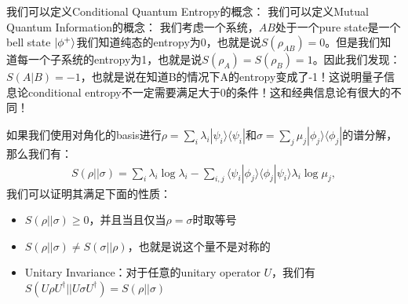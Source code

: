   \bigskip

  我们可以定义Conditional Quantum Entropy的概念：
  我们可以定义Mutual Quantum Information的概念：
  我们考虑一个系统，$ AB $处于一个pure state是一个bell state $ \left| \phi^+ \right\rangle
  $我们知道纯态的entropy为0，也就是说$ S(\rho_{AB}) = 0
  $。但是我们知道每一个子系统的entropy为1，也就是说$ S(\rho_A) = S(\rho_B) = 1 $。因此我们发现：$
  S(A|B) = -1 $，也就是说在知道B的情况下A的entropy变成了-1！这说明量子信息论conditional
  entropy不一定需要满足大于0的条件！这和经典信息论有很大的不同！

  \bigskip

  如果我们使用对角化的basis进行$  \rho = \sum_i \lambda_i |\psi_i\rangle\langle
  \psi_i| $和$ \sigma = \sum_j \mu_j |\phi_j\rangle\langle \phi_j| $的谱分解，那么我们有：
  \begin{align}
    S(\rho || \sigma) = \sum_i \lambda_i \log \lambda_i - \sum_{i,j}
    \langle \psi_i|\phi_j\rangle \langle \phi_j|\psi_i\rangle
    \lambda_i \log \mu_j,
  \end{align}
  我们可以证明其满足下面的性质：
  \begin{itemize}
    \item $ S(\rho || \sigma) \geq 0 $，并且当且仅当$ \rho = \sigma $时取等号
    \item $ S(\rho || \sigma) \neq S(\sigma || \rho) $，也就是说这个量不是对称的
    \item Unitary Invariance：对于任意的unitary operator $ U $，我们有$ S(U
      \rho U^\dagger || U \sigma U^\dagger) = S(\rho || \sigma) $
  \end{itemize}

